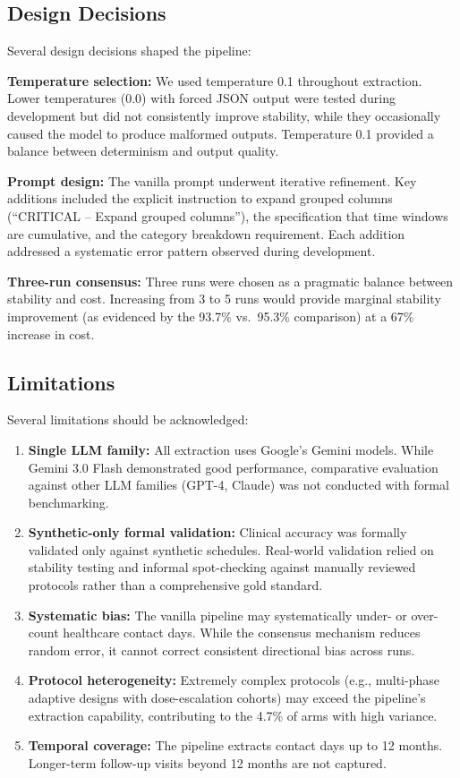 \documentclass[11pt]{article}
\begin{document}
\subsection{Design Decisions}

Several design decisions shaped the pipeline:

\textbf{Temperature selection:} We used temperature 0.1 throughout extraction. Lower temperatures (0.0) with forced JSON output were tested during development but did not consistently improve stability, while they occasionally caused the model to produce malformed outputs. Temperature 0.1 provided a balance between determinism and output quality.

\textbf{Prompt design:} The vanilla prompt underwent iterative refinement. Key additions included the explicit instruction to expand grouped columns (``CRITICAL -- Expand grouped columns''), the specification that time windows are cumulative, and the category breakdown requirement. Each addition addressed a systematic error pattern observed during development.

\textbf{Three-run consensus:} Three runs were chosen as a pragmatic balance between stability and cost. Increasing from 3 to 5 runs would provide marginal stability improvement (as evidenced by the 93.7\% vs.\ 95.3\% comparison) at a 67\% increase in cost.

\subsection{Limitations}

Several limitations should be acknowledged:

\begin{enumerate}[leftmargin=*]
    \item \textbf{Single LLM family:} All extraction uses Google's Gemini models. While Gemini 3.0 Flash demonstrated good performance, comparative evaluation against other LLM families (GPT-4, Claude) was not conducted with formal benchmarking.
    \item \textbf{Synthetic-only formal validation:} Clinical accuracy was formally validated only against synthetic schedules. Real-world validation relied on stability testing and informal spot-checking against manually reviewed protocols rather than a comprehensive gold standard.
    \item \textbf{Systematic bias:} The vanilla pipeline may systematically under- or over-count healthcare contact days. While the consensus mechanism reduces random error, it cannot correct consistent directional bias across runs.
    \item \textbf{Protocol heterogeneity:} Extremely complex protocols (e.g., multi-phase adaptive designs with dose-escalation cohorts) may exceed the pipeline's extraction capability, contributing to the 4.7\% of arms with high variance.
    \item \textbf{Temporal coverage:} The pipeline extracts contact days up to 12 months. Longer-term follow-up visits beyond 12 months are not captured.
\end{enumerate}
\end{document}
